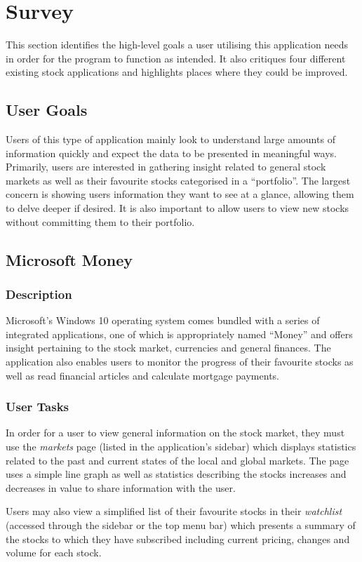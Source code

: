 \documentclass{sigchi}
\begin{document}
\section{Survey}
This section identifies the high-level goals a user utilising this application needs in order for the program to function as intended. It also critiques four different existing stock applications and highlights places where they could be improved.


\subsection{User Goals}
Users of this type of application mainly look to understand large amounts of information quickly and expect the data to be presented in meaningful ways. Primarily, users are interested in gathering insight related to general stock markets as well as their favourite stocks categorised in a ``portfolio''. The largest concern is showing users information they want to see at a glance, allowing them to delve deeper if desired. It is also important to allow users to view new stocks without committing them to their portfolio.


\subsection{Microsoft Money}
\subsubsection{Description}
Microsoft's Windows 10 operating system comes bundled with a series of integrated applications, one of which is appropriately named ``Money'' and offers insight pertaining to the stock market, currencies and general finances. The application also enables users to monitor the progress of their favourite stocks as well as read financial articles and calculate mortgage payments.

\subsubsection{User Tasks}
In order for a user to view general information on the stock market, they must use the \textit{markets} page (listed in the application's sidebar) which displays statistics related to the past and current states of the local and global markets. The page uses a simple line graph as well as statistics describing the stocks increases and decreases in value to share information with the user. \par
Users may also view a simplified list of their favourite stocks in their \textit{watchlist} (accessed through the sidebar or the top menu bar) which presents a summary of the stocks to which they have subscribed including current pricing, changes and volume for each stock.
\end{document}
